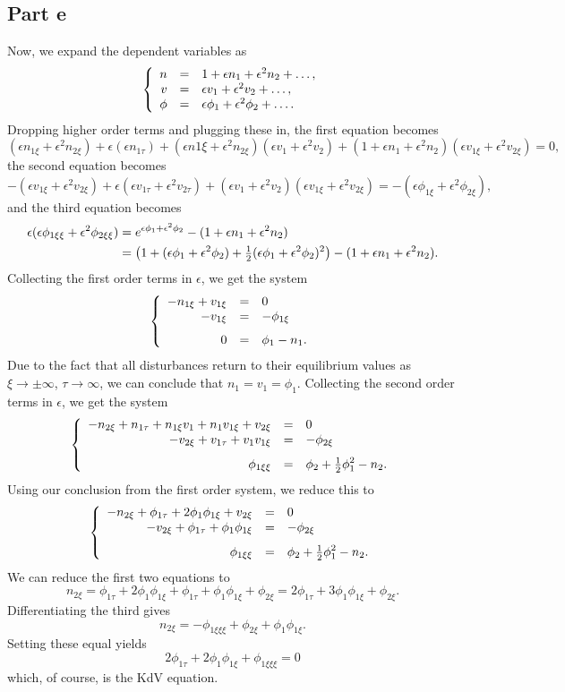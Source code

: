 \documentclass{article}
\begin{document}
\subsection{Part e}
Now, we expand the dependent variables as
\[
\left\{\begin{array}{rcl}
	n&=&1+\epsilon n_1+\epsilon^2 n_2+\ldots, \\
	v&=&\epsilon v_1+\epsilon^2 v_2+\ldots, \\
	\phi&=&\epsilon \phi_1+\epsilon^2 \phi_2+\ldots .
\end{array}\right.
\]
Dropping higher order terms and plugging these in, the first equation becomes
\[
(\epsilon n_{1\xi}+\epsilon^2n_{2\xi})+\epsilon(\epsilon n_{1\tau})+(\epsilon n{1\xi}+\epsilon^2n_{2\xi})(\epsilon v_1+\epsilon^2v_2)+(1+\epsilon n_1+\epsilon^2 n_2)(\epsilon v_{1\xi}+\epsilon^2v_{2\xi})=0,
\]
the second equation becomes
\[
-(\epsilon v_{1\xi}+\epsilon^2v_{2\xi})+\epsilon(\epsilon v_{1\tau}+\epsilon^2 v_{2\tau})+(\epsilon v_1+\epsilon^2v_2)(\epsilon v_{1\xi}+\epsilon^2v_{2\xi})=-(\epsilon\phi_{1\xi}+\epsilon^2\phi_{2\xi}),
\]
and the third equation becomes 
\begin{align*}
\epsilon(\epsilon\phi_{1\xi\xi}+\epsilon^2\phi_{2\xi\xi})&=e^{\epsilon\phi_1+\epsilon^2\phi_2}-(1+\epsilon n_1+\epsilon^2n_2)\\&=
\left(1+(\epsilon\phi_1+\epsilon^2\phi_2)+\mbox{$\frac{1}{2}$}(\epsilon\phi_1+\epsilon^2\phi_2)^2\right)-(1+\epsilon n_1+\epsilon^2n_2).
\end{align*}
Collecting the first order terms in $\epsilon$, we get the system
\[
\sys{
	\ds -n_{1\xi}+v_{1\xi}&=&0\\
	\vs\ds -v_{1\xi}&=&\ds -\phi_{1\xi}\\
	0&=&\ds \phi_1-n_1.
}
\]
Due to the fact that all disturbances return to their equilibrium values as $\xi\rightarrow \pm \infty$,
$\tau \rightarrow \infty$, we can conclude that $n_1=v_1=\phi_1$. Collecting the second order terms in $\epsilon$, we get the system
\[
\sys{
	\ds -n_{2\xi}+n_{1\tau}+n_{1\xi}v_1+n_1v_{1\xi}+v_{2\xi}&=&0\\
	\vs\ds -v_{2\xi}+v_{1\tau}+v_1v_{1\xi}&=&\ds -\phi_{2\xi}\\
	\phi_{1\xi\xi}&=&\ds \phi_2+\half\phi^2_1-n_2.
}
\]
Using our conclusion from the first order system, we reduce this to
\[
\sys{
	\ds -n_{2\xi}+\phi_{1\tau}+2\phi_1\phi_{1\xi}+v_{2\xi}&=&0\\
	\vs\ds -v_{2\xi}+\phi_{1\tau}+\phi_1\phi_{1\xi}&=&\ds -\phi_{2\xi}\\
	\phi_{1\xi\xi}&=&\ds \phi_2+\half\phi^2_1-n_2.
}
\]
We can reduce the first two equations to
\[
n_{2\xi}=\phi_{1\tau}+2\phi_1\phi_{1\xi}+\phi_{1\tau}+\phi_1\phi_{1\xi}+\phi_{2\xi}=2\phi_{1\tau}+3\phi_1\phi_{1\xi}+\phi_{2\xi}.
\]
Differentiating the third gives
\[
n_{2\xi}=-\phi_{1\xi\xi\xi}+\phi_{2\xi}+\phi_1\phi_{1\xi}.
\]
Setting these equal yields
\[
2\phi_{1\tau}+2\phi_1\phi_{1\xi}+\phi_{1\xi\xi\xi}=0
\]
which, of course, is the KdV equation.
\end{document}
